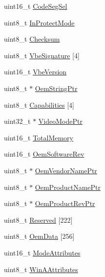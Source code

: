 \begin{DoxyCompactItemize}
\item 
uint16\+\_\+t \mbox{\hyperlink{structRTEMS__PACKED_ab0a4f6f5e835650e6074a8ef704b0534}{Code\+Seg\+Sel}}
\item 
uint8\+\_\+t \mbox{\hyperlink{structRTEMS__PACKED_ac04582c79e9ddfb8b6ffd76693f3d8ed}{In\+Protect\+Mode}}
\item 
uint8\+\_\+t \mbox{\hyperlink{structRTEMS__PACKED_a1c72d72bd57600be2f5974c843bc62ae}{Checksum}}
\item 
uint8\+\_\+t \mbox{\hyperlink{structRTEMS__PACKED_a552ac9871140d01d68db983e62a1d60d}{Vbe\+Signature}} \mbox{[}4\mbox{]}
\item 
uint16\+\_\+t \mbox{\hyperlink{structRTEMS__PACKED_a708d521fa21aea356e77868f43959a0e}{Vbe\+Version}}
\item 
uint8\+\_\+t $\ast$ \mbox{\hyperlink{structRTEMS__PACKED_a5a5ba4930c085c87596aba6dfa369efe}{Oem\+String\+Ptr}}
\item 
uint8\+\_\+t \mbox{\hyperlink{structRTEMS__PACKED_abf554a2174571882e36cb1a25382b730}{Capabilities}} \mbox{[}4\mbox{]}
\item 
uint32\+\_\+t $\ast$ \mbox{\hyperlink{structRTEMS__PACKED_a507eb6e03effa2b42357b1195a51198c}{Video\+Mode\+Ptr}}
\item 
uint16\+\_\+t \mbox{\hyperlink{structRTEMS__PACKED_afd177a13a7c2cf8ade0daa1aa9bf34ca}{Total\+Memory}}
\item 
uint16\+\_\+t \mbox{\hyperlink{structRTEMS__PACKED_a2fc9b17780a7dae338b021a66e803285}{Oem\+Software\+Rev}}
\item 
uint8\+\_\+t $\ast$ \mbox{\hyperlink{structRTEMS__PACKED_ab797411ca84ee889b0a247c15e3f71d0}{Oem\+Vendor\+Name\+Ptr}}
\item 
uint8\+\_\+t $\ast$ \mbox{\hyperlink{structRTEMS__PACKED_a9c541502d4addea6c24b987629b67ef9}{Oem\+Product\+Name\+Ptr}}
\item 
uint8\+\_\+t $\ast$ \mbox{\hyperlink{structRTEMS__PACKED_ae22e7b2746fec1be66bd5b3b0f28b5f4}{Oem\+Product\+Rev\+Ptr}}
\item 
uint8\+\_\+t \mbox{\hyperlink{structRTEMS__PACKED_a4a9a2056fab076b2a310ec86d315c646}{Reserved}} \mbox{[}222\mbox{]}
\item 
uint8\+\_\+t \mbox{\hyperlink{structRTEMS__PACKED_a5431bdd8fb84d5175e474dedd85f8e41}{Oem\+Data}} \mbox{[}256\mbox{]}
\item 
uint16\+\_\+t \mbox{\hyperlink{structRTEMS__PACKED_a9b512f0e4dd1bcfc903a052cbc8ac85b}{Mode\+Attributes}}
\item 
uint8\+\_\+t \mbox{\hyperlink{structRTEMS__PACKED_a868eae3de3fee28deb3c41f23e49cf59}{Win\+A\+Attributes}}

\end{DoxyCompactItemize}
